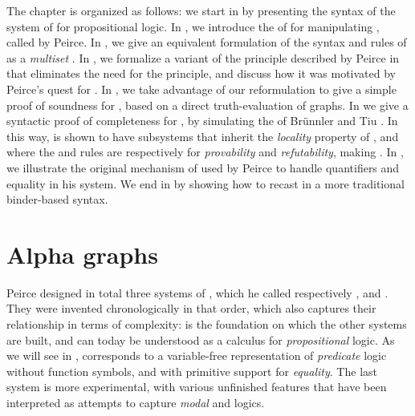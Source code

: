 \begin{scope}
\newpage

The chapter is organized as follows: we start in  by presenting
the  syntax of the system  of  for
 propositional logic. In , we introduce the
 of  for manipulating , called
\emph{} by Peirce. In , we give
an equivalent formulation of the syntax and rules of  as a
\emph{multiset} . In , we formalize a
variant of the  principle described by Peirce in
 that eliminates the need for the
 principle, and discuss how it was motivated by Peirce's quest
for \emph{}. In , we take advantage
of our reformulation to give a simple proof of soundness for , based
on a direct truth-evaluation of graphs. In  we give a
syntactic proof of completeness for , by simulating the   of Brünnler and Tiu . In
this way,  is shown to have subsystems that inherit the
\emph{locality} property of , and where the  and
 rules are respectively  for \emph{provability} and
\emph{refutability}, making  \emph{}. In ,
we illustrate the original mechanism of \emph{} used by
Peirce to handle quantifiers and equality in his  system. We end in
 by showing how to recast  in a more
traditional binder-based syntax.

\section{Alpha graphs}

\AP
Peirce designed in total three systems of , which he called respectively
,  and . They were invented
chronologically in that order, which also captures their relationship in terms
of complexity:  is the foundation on which the other systems are
built, and can today be understood as a  calculus for 
\emph{propositional} logic. As we will see in , 
corresponds to a variable-free representation of \emph{predicate} logic without
function symbols, and with primitive support for \emph{equality}. The last
system  is more experimental, with various unfinished features that
have been interpreted as attempts to capture \emph{modal}
 and \emph{} logics.


\end{scope}
